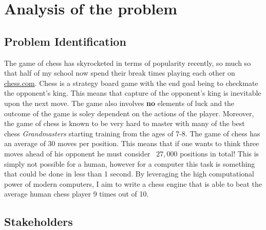 \pagestyle{fancy}

\chapter{Analysis of the problem}

\section{Problem Identification}
The game of chess has skyrocketed in terms of popularity
recently, so much so that half of my school now spend their
break times playing each other on \url{chess.com}. Chess 
is a strategy board game with the end goal being to checkmate
the opponent's king. This means that capture of 
the opponent's king is inevitable upon the next move. The 
game also involves \textbf{no} elements of luck and the 
outcome of the game is soley dependent on the actions of the
player. Moreover, the game of chess is known to be very
hard to master with many of the best chess
\textit{Grandmasters} starting training from the
ages of 7-8. The game of chess has an average of 30 moves 
per position. This means that if one wants to think three 
moves ahead of his opponent he must consider ~$27,000$ 
positions in total! This is simply not possible for a 
human, however for a computer this task is something that
could be done in less than 1 second. By leveraging the 
high computational power of modern computers, I aim to 
write a chess engine that is able to beat the average 
human chess player 9 times out of 10.


\section{Stakeholders}
